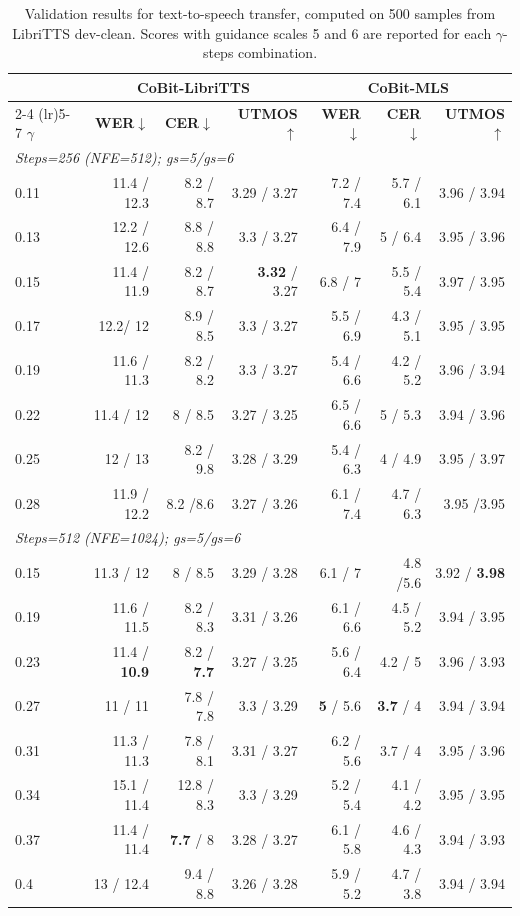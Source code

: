 \begin{table}[t]
\centering
\footnotesize
\setlength{\tabcolsep}{4pt}
\begin{tabular}{l rrrrrr}
\toprule
 & \multicolumn{3}{c}{\textbf{CoBit-LibriTTS}} & \multicolumn{3}{c}{\textbf{CoBit-MLS}} \\
\cmidrule(lr){2-4} \cmidrule(lr){5-7}
$\gamma$ & \textbf{WER}$\downarrow$ & \textbf{CER}$\downarrow$ & \textbf{UTMOS}$\uparrow$ & \textbf{WER}$\downarrow$ & \textbf{CER}$\downarrow$ & \textbf{UTMOS}$\uparrow$ \\
\midrule
\multicolumn{7}{l}{\emph{Steps=256 (NFE=512); gs=5/gs=6}} \\
0.11 & 11.4 / 12.3 & 8.2 / 8.7 & 3.29 / 3.27 & 7.2 / 7.4 & 5.7 / 6.1 & 3.96 / 3.94 \\
0.13 & 12.2 / 12.6 & 8.8 / 8.8 & 3.3 / 3.27 & 6.4 / 7.9 & 5 / 6.4 & 3.95 / 3.96 \\
0.15 & 11.4 / 11.9 & 8.2 / 8.7 & \textbf{3.32} / 3.27 & 6.8 / 7 & 5.5 / 5.4 & 3.97 / 3.95 \\
0.17 & 12.2/ 12 & 8.9 / 8.5 & 3.3 / 3.27 & 5.5 / 6.9 & 4.3 / 5.1 & 3.95 / 3.95 \\
0.19 & 11.6 / 11.3 & 8.2 / 8.2 & 3.3 / 3.27 & 5.4 / 6.6 & 4.2 / 5.2 & 3.96 / 3.94 \\
0.22 & 11.4 / 12 & 8 / 8.5 & 3.27 / 3.25 & 6.5 / 6.6 & 5 / 5.3 & 3.94 / 3.96 \\
0.25 & 12 / 13 & 8.2 / 9.8 & 3.28 / 3.29 & 5.4 / 6.3 & 4 / 4.9 & 3.95 / 3.97 \\
0.28 & 11.9 / 12.2 & 8.2 /8.6 & 3.27 / 3.26 & 6.1 / 7.4 & 4.7 / 6.3 & 3.95 /3.95 \\
\midrule
\multicolumn{7}{l}{\emph{Steps=512 (NFE=1024); gs=5/gs=6}} \\
0.15 & 11.3 / 12 & 8 / 8.5 & 3.29 / 3.28 & 6.1 / 7 & 4.8 /5.6 & 3.92 / \textbf{3.98} \\
0.19 & 11.6 / 11.5 & 8.2 / 8.3 & 3.31 / 3.26 & 6.1 / 6.6 & 4.5 / 5.2 & 3.94 / 3.95 \\
0.23 & 11.4 / \textbf{10.9} & 8.2 / \textbf{7.7} & 3.27 / 3.25 & 5.6 / 6.4 & 4.2 / 5 & 3.96 / 3.93 \\
0.27 & 11 / 11 & 7.8 / 7.8 & 3.3 / 3.29 & \textbf{5} / 5.6 & \textbf{3.7} / 4 & 3.94 / 3.94 \\
0.31 & 11.3 / 11.3 & 7.8 / 8.1 & 3.31 / 3.27 & 6.2 / 5.6 & 3.7 / 4 & 3.95 / 3.96 \\
0.34 & 15.1 / 11.4 & 12.8 / 8.3 & 3.3 / 3.29 & 5.2 / 5.4 & 4.1 / 4.2 & 3.95 / 3.95 \\
0.37 & 11.4 / 11.4 & \textbf{7.7} / 8 & 3.28 / 3.27 & 6.1 / 5.8 & 4.6 / 4.3 & 3.94 / 3.93 \\
0.4 & 13 / 12.4 & 9.4 / 8.8 & 3.26 / 3.28 & 5.9 / 5.2 & 4.7 / 3.8 & 3.94 / 3.94 \\
\bottomrule
\end{tabular}
\caption{Validation results for text-to-speech transfer, computed on 500 samples from LibriTTS dev-clean. Scores with guidance scales 5 and 6 are reported for each $\gamma$-steps combination.}
\label{tab:audio:val:tts}
\end{table}

